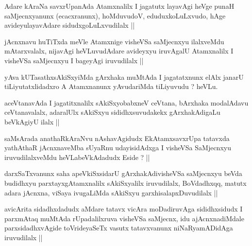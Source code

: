 \begin{artha}
Adare kAraNa savxrUpanAda Atamxnalilx I jagatutx layavAgi heVge punaH
saMjecnxyanunx (ecacxranunx), hoMduvudoV, eduduxkoLuLxvudo, hAge
avideyulayavAdare sidudxgoLuLxvudilalx ||
\end{artha}

\begin{artha}
jAcnxnavu huTiTxda meVle Atamxnige visheVSa saMjecnxyu ilalxveMdu
mAtarxvalalx, nijavAgi heVLuvudAdare avideyxyu iruvAgalU Atamxnalilx I
visheVSa saMjecnxyu I bageyAgi iruvudilalx ||
\end{artha}

\begin{artha}
yAva kUTasathxsAkiSxyiMda gArxhaka muMtAda I jagatatxnunx elAlx janarU
tiLiyutatxlidadxro A Atamxnanunx yAvudariMda tiLiyuvudu ? heVLu.
\end{artha}


\begin{artha}
aceVtanavAda I jagatitxnalilx sAkiSxyobabxneV ceVtana,  bArxhaka
modalAdavu ceVtanavalalx, adaralUlx sAkiSxyu sididhxsuvudakekx
gArxhakAdigaLu beVkAgiyU ilalx ||
\end{artha}

\begin{artha}
saMsArada anathaRkAraNvu nAshavAgidudx EkAtamxsavxrUpa tatavxda
yathAthaR jAcnxnaveMba sUyaRnu udayisidAdxga I visheVSa SaMjecnxyu
iruvudilalxveMdu heVLabeVkAdadudx Eside ? ||
\end{artha}


\begin{artha}
darxSaTxvanunx saha apeVkiSxsidarU gArxhakAdivisheVSa saMjecnxyu beVda
budidhxyu parxtayxgAtamxnalilx sAkiSxyalilx iruvudilalx, BoVdadhxqq,
matutx adara jAcnxna, viSaya ivugaLiMda sAkiSxyu
garxhisalapxDuvudilalx ||
\end{artha}


\begin{artha}
avicArita sidadhxdadudx aMdare tatavx vicAra moDadiruvAga
sididhxsidudx I parxmAtaq muMtAda rUpadalilxruva visheVSa saMjecnx,
idu ajAcnxnadiMdale parxsidadhxvAgide toVrideyaSeTx vasutx
tatavxvanunx niNaRyamADidAga iruvudilalx ||
\end{artha}


